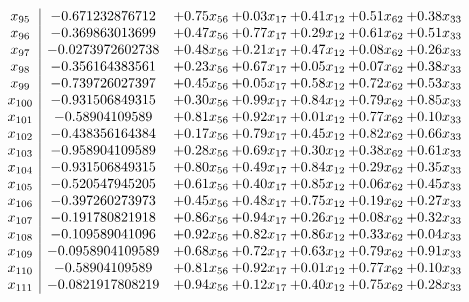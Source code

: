 \documentclass[8pt]{article}
\begin{document}
\[\begin{array}{c| c c@{\hskip 2pt} c@{\hskip 2pt} c@{\hskip 2pt} c@{\hskip 2pt} c@{\hskip 2pt} }
 x_{95}   &  -0.671232876712 & +  0.75 x_{56} & +  0.03 x_{17} & +  0.41 x_{12} & +  0.51 x_{62} & +  0.38 x_{33}\\
 x_{96}   &  -0.369863013699 & +  0.47 x_{56} & +  0.77 x_{17} & +  0.29 x_{12} & +  0.61 x_{62} & +  0.51 x_{33}\\
 x_{97}   &  -0.0273972602738 & +  0.48 x_{56} & +  0.21 x_{17} & +  0.47 x_{12} & +  0.08 x_{62} & +  0.26 x_{33}\\
 x_{98}   &  -0.356164383561 & +  0.23 x_{56} & +  0.67 x_{17} & +  0.05 x_{12} & +  0.07 x_{62} & +  0.38 x_{33}\\
 x_{99}   &  -0.739726027397 & +  0.45 x_{56} & +  0.05 x_{17} & +  0.58 x_{12} & +  0.72 x_{62} & +  0.53 x_{33}\\
 x_{100}   &  -0.931506849315 & +  0.30 x_{56} & +  0.99 x_{17} & +  0.84 x_{12} & +  0.79 x_{62} & +  0.85 x_{33}\\
 x_{101}   &  -0.58904109589 & +  0.81 x_{56} & +  0.92 x_{17} & +  0.01 x_{12} & +  0.77 x_{62} & +  0.10 x_{33}\\
 x_{102}   &  -0.438356164384 & +  0.17 x_{56} & +  0.79 x_{17} & +  0.45 x_{12} & +  0.82 x_{62} & +  0.66 x_{33}\\
 x_{103}   &  -0.958904109589 & +  0.28 x_{56} & +  0.69 x_{17} & +  0.30 x_{12} & +  0.38 x_{62} & +  0.61 x_{33}\\
 x_{104}   &  -0.931506849315 & +  0.80 x_{56} & +  0.49 x_{17} & +  0.84 x_{12} & +  0.29 x_{62} & +  0.35 x_{33}\\
 x_{105}   &  -0.520547945205 & +  0.61 x_{56} & +  0.40 x_{17} & +  0.85 x_{12} & +  0.06 x_{62} & +  0.45 x_{33}\\
 x_{106}   &  -0.397260273973 & +  0.45 x_{56} & +  0.48 x_{17} & +  0.75 x_{12} & +  0.19 x_{62} & +  0.27 x_{33}\\
 x_{107}   &  -0.191780821918 & +  0.86 x_{56} & +  0.94 x_{17} & +  0.26 x_{12} & +  0.08 x_{62} & +  0.32 x_{33}\\
 x_{108}   &  -0.109589041096 & +  0.92 x_{56} & +  0.82 x_{17} & +  0.86 x_{12} & +  0.33 x_{62} & +  0.04 x_{33}\\
 x_{109}   &  -0.0958904109589 & +  0.68 x_{56} & +  0.72 x_{17} & +  0.63 x_{12} & +  0.79 x_{62} & +  0.91 x_{33}\\
 x_{110}   &  -0.58904109589 & +  0.81 x_{56} & +  0.92 x_{17} & +  0.01 x_{12} & +  0.77 x_{62} & +  0.10 x_{33}\\
 x_{111}   &  -0.0821917808219 & +  0.94 x_{56} & +  0.12 x_{17} & +  0.40 x_{12} & +  0.75 x_{62} & +  0.28 x_{33}\\

\end{array}\]
\end{document}
